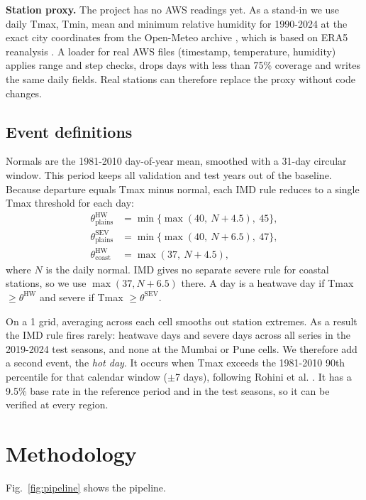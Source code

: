 \documentclass[conference,10pt]{IEEEtran}
\begin{document}
\textbf{Station proxy.} The project has no AWS readings yet. As a stand-in we use daily Tmax, Tmin, mean and minimum relative humidity for 1990-2024 at the exact city coordinates from the Open-Meteo archive \cite{zippenfenig2024openmeteo}, which is based on ERA5 reanalysis \cite{hersbach2020era5}. A loader for real AWS files (timestamp, temperature, humidity) applies range and step checks, drops days with less than 75\% coverage and writes the same daily fields. Real stations can therefore replace the proxy without code changes.

\subsection{Event definitions}
Normals are the 1981-2010 day-of-year mean, smoothed with a 31-day circular window. This period keeps all validation and test years out of the baseline. Because departure equals Tmax minus normal, each IMD rule reduces to a single Tmax threshold for each day:
\begin{align}
\theta^{\text{HW}}_{\text{plains}} &= \min\{\max(40,\ N+4.5),\ 45\},\\
\theta^{\text{SEV}}_{\text{plains}} &= \min\{\max(40,\ N+6.5),\ 47\},\\
\theta^{\text{HW}}_{\text{coast}} &= \max(37,\ N+4.5),
\end{align}
where $N$ is the daily normal. IMD gives no separate severe rule for coastal stations, so we use $\max(37, N+6.5)$ there. A day is a heatwave day if Tmax $\ge \theta^{\text{HW}}$ and severe if Tmax $\ge \theta^{\text{SEV}}$.

On a 1\textdegree{} grid, averaging across each cell smooths out station extremes. As a result the IMD rule fires rarely: \NHWTest{} heatwave days and \NSevTest{} severe days across all \NSeries{} series in the 2019-2024 test seasons, and none at the Mumbai or Pune cells. We therefore add a second event, the \emph{hot day}. It occurs when Tmax exceeds the 1981-2010 90th percentile for that calendar window ($\pm$7 days), following Rohini et al. \cite{rohini2016heat}. It has a 9.5\% base rate in the reference period and \HotRateTest{} in the test seasons, so it can be verified at every region.



\section{Methodology}
Fig.~\ref{fig:pipeline} shows the pipeline.
\end{document}
